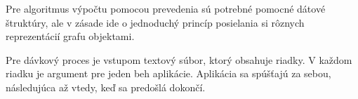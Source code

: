 Pre algoritmus výpočtu pomocou prevedenia sú potrebné pomocné dátové štruktúry, 
ale v zásade ide o jednoduchý princíp posielania si rôznych reprezentácií grafu 
objektami.

Pre dávkový proces je vstupom textový súbor, ktorý obsahuje riadky. V každom 
riadku je argument pre jeden beh aplikácie. Aplikácia sa spúšťajú za sebou, 
následujúca až vtedy, keď sa predošlá dokončí.






